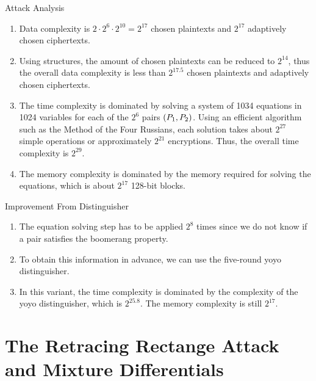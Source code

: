 \documentclass[notheorems]{beamer}
\theoremstyle{definition}
\theoremstyle{example}
\begin{document}
    \begin{frame}[<+->]{Attack Analysis}
        \begin{enumerate}
            \item Data complexity is \(2 \cdot 2^6 \cdot 2^{10} = 2^{17}\)
            chosen plaintexts and \(2^{17}\) adaptively chosen ciphertexts.
            \item Using structures, the amount of chosen plaintexts can be
            reduced to \(2^{14}\), thus the overall data complexity is less
            than \(2^{17.5}\) chosen plaintexts and adaptively chosen
            ciphertexts.
            \item The time complexity is dominated by solving a system
            of 1034 equations in 1024 variables for each of the \(2^6\) pairs
            \((P_1, P_2)\). Using an efficient algorithm such as the
            Method of the Four Russians, each solution takes about \(2^{27}\)
            simple operations or approximately \(2^{21}\) encryptions. Thus,
            the overall time complexity is \(2^{29}\).
            \item The memory complexity is dominated by the memory required for
            solving the equations, which is about \(2^{17}\) 128-bit blocks.
        \end{enumerate}
    \end{frame}

    \begin{frame}[<+->]{Improvement From Distinguisher}
        \begin{enumerate}
            \item The equation solving step has to be applied \(2^8\) times
            since we do not know if a pair satisfies the boomerang property.
            \item To obtain this information in advance, we can use the 
            five-round yoyo distinguisher.
            \item In this variant, the time complexity is dominated by the 
            complexity of the yoyo distinguisher, which is \(2^{25.8}\). The
            memory complexity is still \(2^{17}\).
        \end{enumerate}
    \end{frame}

    \section[Retracing Rectangle Attack]{The Retracing Rectange Attack and Mixture Differentials}
    \label{sec:retracing-rectangle}
    
\end{document}
